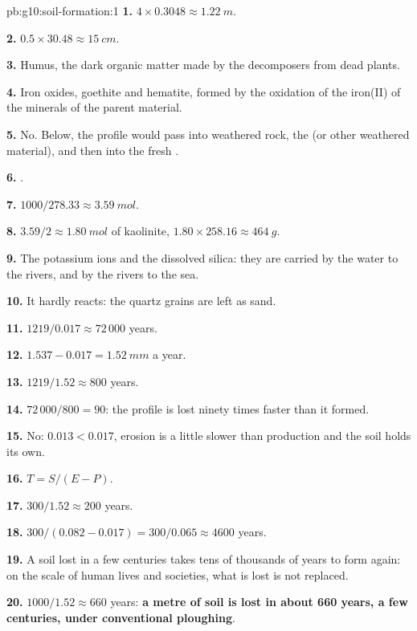 \begin{solution}{pb:g10:soil-formation:1}
\textbf{1.} $4 \times 0.3048 \approx \qty{1.22}{m}$.

\textbf{2.} $0.5 \times 30.48 \approx \qty{15}{cm}$.

\textbf{3.} Humus, the dark organic matter made by the decomposers from dead
plants.

\textbf{4.} Iron oxides, goethite and hematite, formed by the oxidation of
the iron(II) of the minerals of the parent material.

\textbf{5.} No. Below, the profile would pass into weathered rock, the
 (or other weathered material), and then into the fresh .

\textbf{6.} .

\textbf{7.} $1000/278.33 \approx \qty{3.59}{mol}$.

\textbf{8.} $3.59/2 \approx \qty{1.80}{mol}$ of kaolinite, $1.80 \times 258.16
\approx \qty{464}{g}$.

\textbf{9.} The potassium ions and the dissolved silica: they are carried by
the water to the rivers, and by the rivers to the sea.

\textbf{10.} It hardly reacts: the quartz grains are left as sand.

\textbf{11.} $1219/0.017 \approx 72\,000$ years.

\textbf{12.} $1.537 - 0.017 = \qty{1.52}{mm}$ a year.

\textbf{13.} $1219/1.52 \approx 800$ years.

\textbf{14.} $72\,000/800 = 90$: the profile is lost ninety times faster than
it formed.

\textbf{15.} No: $0.013 < 0.017$, erosion is a little slower than production
and the soil holds its own.

\textbf{16.} $T = S/(E - P)$.

\textbf{17.} $300/1.52 \approx 200$ years.

\textbf{18.} $300/(0.082 - 0.017) = 300/0.065 \approx 4600$ years.

\textbf{19.} A soil lost in a few centuries takes tens of thousands of years
to form again: on the scale of human lives and societies, what is lost is
not replaced.

\textbf{20.} $1000/1.52 \approx 660$ years: \textbf{a metre of soil is lost
in about 660 years, a few centuries, under conventional ploughing}.
\end{solution}
